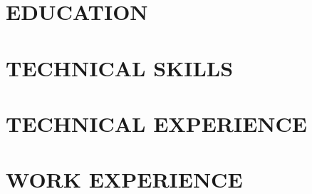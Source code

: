 \documentclass{zsresume}
\begin{document}

\Header

\section{EDUCATION}
\UniversitySWE
\HighSchoolShort

\section{TECHNICAL SKILLS}
\SkillsGroupedSWE

\section{TECHNICAL EXPERIENCE}
\TransitFull
\ClassifierFull

\section{WORK EXPERIENCE}
\InternFull
\TA
\end{document}
